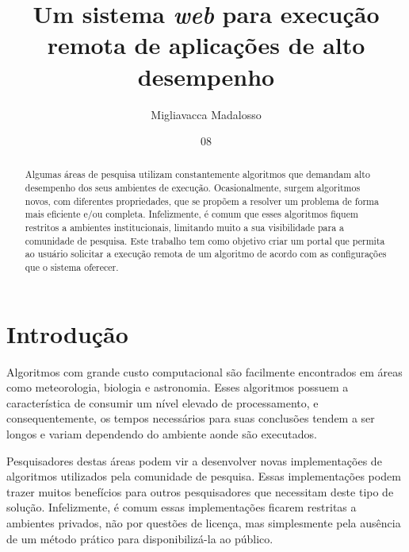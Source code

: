 \documentclass[tg]{mdtufsm}
\title{Um sistema \emph{ web } para execução remota de aplicações de alto desempenho}
\author{Migliavacca Madalosso}{Otávio}
\institute{Centro de Tecnologia}
\date{08}{Outubro}{2015}
\begin{document}
\maketitle
\makeapprove

\begin{abstract}
Algumas áreas de pesquisa utilizam constantemente algoritmos que demandam alto desempenho dos seus ambientes de execução. Ocasionalmente, surgem algoritmos novos, com diferentes propriedades, que se propõem a resolver um problema de forma mais eficiente e/ou completa. Infelizmente, é comum que esses algoritmos fiquem restritos a ambientes institucionais, limitando muito a sua visibilidade para a comunidade de pesquisa. Este trabalho tem como objetivo criar um portal que permita ao usuário solicitar a execução remota de um algoritmo de acordo com as configurações que o sistema oferecer.
\end{abstract}

\tableofcontents

\setlength{\baselineskip}{1.5\baselineskip}


\chapter{Introdução}

Algoritmos com grande custo computacional são facilmente encontrados em áreas como meteorologia, biologia e astronomia. Esses algoritmos possuem a característica de consumir um nível elevado de processamento, e consequentemente, os tempos necessários para suas conclusões tendem a ser longos e variam dependendo do ambiente aonde são executados.

Pesquisadores destas áreas podem vir a desenvolver novas implementações de algoritmos utilizados pela comunidade de pesquisa. Essas implementações podem trazer muitos benefícios para outros pesquisadores que necessitam deste tipo de solução. Infelizmente, é comum essas implementações ficarem restritas a ambientes privados, não por questões de licença, mas simplesmente pela ausência de um método prático para disponibilizá-la ao público.
\end{document}
